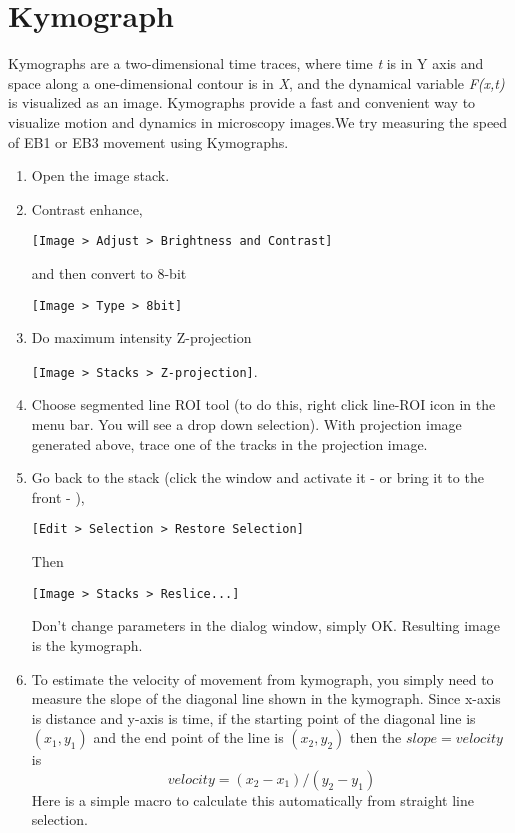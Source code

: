 \documentclass[11pnt]{article}
\begin{document}
\section{Kymograph}

Kymographs are a two-dimensional time traces, where time \textit{t} is in Y axis and space along a one-dimensional contour is in \textit{X}, and the dynamical variable \textit{F(x,t) }is
visualized as an image. Kymographs provide a fast and convenient way to
visualize motion and dynamics in microscopy images.We try measuring the speed of EB1 or EB3 movement using Kymographs. 

\begin{enumerate}
\item Open the image stack. 
\item Contrast enhance, 

\verb"[Image > Adjust > Brightness and Contrast]"

and then convert to 8-bit

\verb"[Image > Type > 8bit]"

\item Do maximum intensity Z-projection 

\verb"[Image > Stacks > Z-projection]". 

\item Choose segmented line ROI tool (to do this, right click line-ROI icon in the menu bar. You will see a drop down selection). With projection image generated above, trace one of the tracks in the projection image.

\item Go back to the stack (click the window and activate it - or bring it to the front - ), 

\verb"[Edit > Selection > Restore Selection]"

Then 

\verb"[Image > Stacks > Reslice...]" 

Don't change parameters in the dialog window, simply OK. Resulting image is the kymograph. 

\item To estimate the velocity of movement from kymograph, you simply need to measure the slope of the diagonal line shown in the kymograph. Since x-axis is distance and y-axis is time, if the starting point of the diagonal line is $(x_1, y_1)$ and the end point of the line is $(x_2, y_2)$ then the $slope = velocity$ is  
\[
velocity = (x_2 - x_1) / (y_2 - y_1) 
\]
Here is a simple macro to calculate this automatically from straight line selection. 
\end{enumerate}
\end{document}
